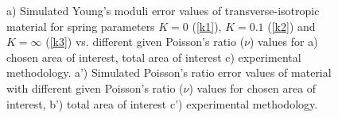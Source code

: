 \documentclass[review]{elsarticle}
\begin{document}
\begin{center}
\begin{figure}[!ht]
\captionsetup{justification=centering}
\caption{a) Simulated Young's moduli error values of transverse-isotropic
material for spring parameters $K=0$ (\ref{k1}), $K=0.1$ (\ref{k2}) and
$K=\infty$ (\ref{k3}) vs.
different given Poisson's ratio ($\nu$) values for a) chosen area of
interest, total area of interest c) experimental methodology.
a') Simulated Poisson's ratio error values of material with different given
Poisson's ratio ($\nu$) values for chosen area of
interest, b') total area of interest c') experimental methodology.
}
\label{fig:strainmethods}


\end{figure}
\end{center}


\color{black}
\end{document}

